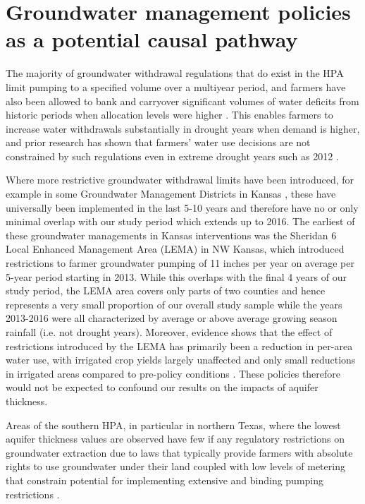 \documentclass[
]{article}
\begin{document}
\hypertarget{pathway-reg}{%
\section{Groundwater management policies as a potential causal pathway}\label{pathway-reg}}

The majority of groundwater withdrawal regulations that do exist in the HPA limit pumping to a specified volume over a multiyear period, and farmers have also been allowed to bank and carryover significant volumes of water deficits from historic periods when allocation levels were higher \citep{rimvsaite2023groundwater}. This enables farmers to increase water withdrawals substantially in drought years when demand is higher, and prior research has shown that farmers' water use decisions are not constrained by such regulations even in extreme drought years such as 2012 \citep{foster2019assessing}.

Where more restrictive groundwater withdrawal limits have been introduced, for example in some Groundwater Management Districts in Kansas \citep{marston2022importance, rimvsaite2023groundwater}, these have universally been implemented in the last 5-10 years and therefore have no or only minimal overlap with our study period which extends up to 2016. The earliest of these groundwater managements in Kansas interventions was the Sheridan 6 Local Enhanced Management Area (LEMA) in NW Kansas, which introduced restrictions to farmer groundwater pumping of 11 inches per year on average per 5-year period starting in 2013. While this overlaps with the final 4 years of our study period, the LEMA area covers only parts of two counties and hence represents a very small proportion of our overall study sample while the years 2013-2016 were all characterized by average or above average growing season rainfall (i.e. not drought years). Moreover, evidence shows that the effect of restrictions introduced by the LEMA has primarily been a reduction in per-area water use, with irrigated crop yields largely unaffected and only small reductions in irrigated areas compared to pre-policy conditions \citep{drysdale2018adaptation, deines2021combining}. These policies therefore would not be expected to confound our results on the impacts of aquifer thickness. 

Areas of the southern HPA, in particular in northern Texas, where the lowest aquifer thickness values are observed have few if any regulatory restrictions on groundwater extraction due to laws that typically provide farmers with absolute rights to use groundwater under their land coupled with low levels of metering that constrain potential for implementing extensive and binding pumping restrictions \citep{wheeler2016lessons, closas2018chronicle}. 
\end{document}
